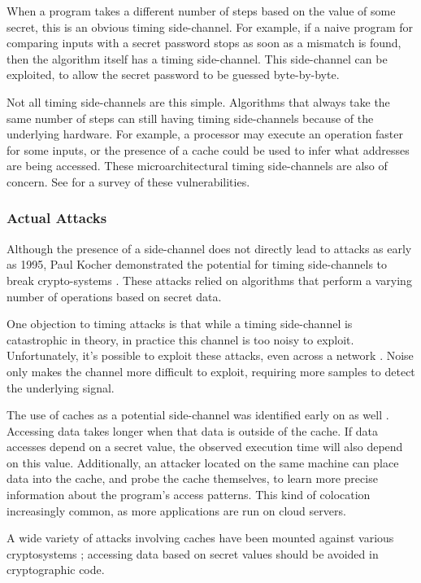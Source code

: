 \documentclass[11pt, a4paper]{article} %
\begin{document}
{When a program takes a different number of steps based on the value of some
secret, this is an obvious timing side-channel.
For example, if a naive program for comparing inputs with a secret password
stops as soon as a mismatch is found, then the algorithm itself has
a timing side-channel. This side-channel can be exploited, to allow
the secret password to be guessed byte-by-byte.

Not all timing side-channels are this simple. Algorithms
that always take the same number of steps
can still having timing side-channels because of the underlying
hardware. For example, a processor may
execute an operation faster for some inputs, or the presence of a cache
could be used to infer what addresses are being accessed. These
microarchitectural timing side-channels are also of concern.
See \cite{ge_survey_2018} for a survey of these vulnerabilities.

\subsubsection{Actual Attacks}

Although the presence of a side-channel
does not directly lead to attacks
as early as 1995, Paul Kocher
demonstrated the potential for timing side-channels to break
crypto-systems
\cite{kocher_cryptanalysis_1995, kocher_timing_1996}.
These attacks relied on algorithms that perform a varying number of
operations based on secret data. 

One objection to timing attacks is that
while a timing side-channel is catastrophic in theory, in practice
this channel is too noisy to exploit. Unfortunately,
it's possible to exploit these attacks, even across
a network \cite{brumley_remote_2005, brumley_remote_2011}.
Noise only makes the channel more difficult to exploit,
requiring more samples to detect the underlying signal.

The use of caches as a potential side-channel was
identified early on as well \cite{page_theoretical_2002}.
Accessing data takes longer when that data is outside
of the cache.
If data accesses depend on a secret value, the observed execution
time will also depend on this value. Additionally,
an attacker located on the same machine
can place data into the cache, and probe
the cache themselves, to learn more precise information about the
program's access patterns. This kind of colocation increasingly common,
as more applications are run on cloud servers.

A wide variety of attacks involving caches have been mounted
against various cryptosystems
\cite{
  bernstein_cache-timing_2005,
  yarom_cachebleed_2017,
  cabrera_aldaya_cache-timing_2019}
; accessing data based on secret values should
be avoided in cryptographic code.

}
\end{document}
